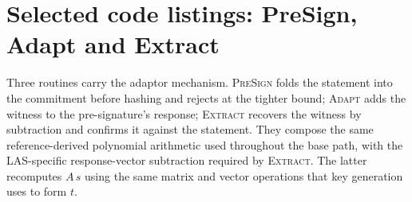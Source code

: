 \FloatBarrier

\section{Selected code listings: PreSign, Adapt and Extract}
\label{app:listing}

Three routines carry the adaptor mechanism. \textsc{PreSign} folds the statement into the
commitment before hashing and rejects at the tighter bound; \textsc{Adapt} adds the
witness to the pre-signature's response; \textsc{Extract} recovers the witness by
subtraction and confirms it against the statement. They compose the same
reference-derived polynomial arithmetic used throughout the base path, with the
LAS-specific response-vector subtraction required by \textsc{Extract}. The latter
recomputes $A\,s$ using the same matrix and vector operations that key generation uses to
form $t$.

